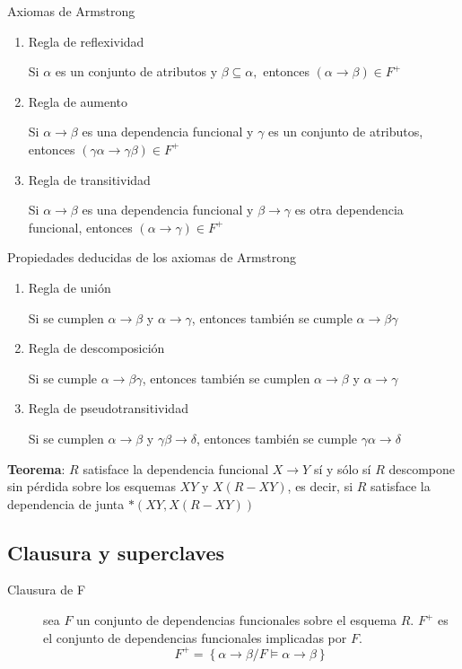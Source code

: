 \documentclass[a4paper, twoside]{article}
\begin{document}
\begin{definicion}[0.9\textwidth]{Axiomas de Armstrong}
	\begin{enumerate}
		\item Regla de reflexividad

		Si $\alpha$ es un conjunto de atributos y $\beta\subseteq\alpha,$ entonces $(\alpha\to\beta)\in F^{+}$

		\item Regla de aumento

		Si $\alpha \to \beta$ es una dependencia funcional y $\gamma$ es un conjunto de atributos, entonces $(\gamma \alpha \to \gamma \beta) \in F^{+}$

		\item Regla de transitividad

		Si $\alpha \to \beta$ es una dependencia funcional y $\beta \to \gamma$ es otra dependencia funcional, entonces $(\alpha \to \gamma) \in F^{+}$
	\end{enumerate}
\end{definicion}

\begin{propiedades}[0.9\textwidth]{Propiedades deducidas de los axiomas de Armstrong}
	\begin{enumerate}
		\item Regla de unión

		Si se cumplen $\alpha\to\beta$ y $\alpha\to\gamma$, entonces también se cumple $\alpha\to\beta\gamma$

		\item Regla de descomposición

		Si se cumple $\alpha\to\beta\gamma$, entonces también se cumplen $\alpha\to\beta$ y $\alpha\to\gamma$

		\item Regla de pseudotransitividad

		Si se cumplen $\alpha\to\beta$ y $\gamma\beta\to\delta$, entonces también se cumple $\gamma\alpha\to\delta$
	\end{enumerate}
\end{propiedades}

\textbf{Teorema}: $R$ satisface la dependencia funcional $X\to Y$ sí y sólo sí $R$ descompone sin pérdida sobre los esquemas $XY$ y $X(R-XY)$, es decir, si $R$ satisface la dependencia de junta $*\left( XY, X(R-XY) \right)$

\subsection{Clausura y superclaves}
\begin{description}
	\item[Clausura de F] sea $F$ un conjunto de dependencias funcionales sobre el esquema $R$. $F^{+}$ es el conjunto de dependencias funcionales implicadas por $F$.
	\[
		F^{+}=\left\{ \alpha\to\beta/F\vDash\alpha\to\beta\right\} 
	\]
\end{description}
\end{document}

